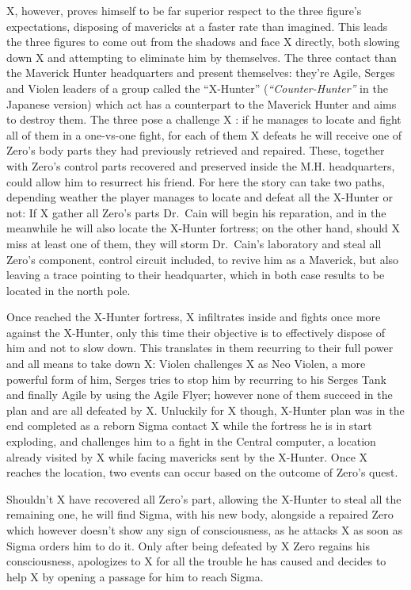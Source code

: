 X, however, proves himself to be far superior respect to the three figure's expectations, disposing of mavericks at a faster rate than imagined. This leads the three figures to come out from the shadows and face X directly, both slowing down X and attempting to eliminate him by themselves. The three contact than the Maverick Hunter headquarters and present themselves: they're Agile, Serges and Violen leaders of a group called the ``X-Hunter'' (\textit{``Counter-Hunter''} in the Japanese version) which act has a counterpart to the Maverick Hunter and aims to destroy them. The three pose a challenge X : if he manages to locate and fight all of them in a one-vs-one fight, for each of them X defeats he will receive one of Zero's body parts they had previously retrieved and repaired. These, together with Zero's control parts recovered and preserved inside the M.H. headquarters, could allow him to resurrect his friend. For here the story can take two paths, depending weather the player manages to locate and defeat all the X-Hunter or not:
If X gather all Zero's parts Dr.~Cain will begin his reparation, and in the meanwhile he will also locate the X-Hunter fortress; on the other hand, should X miss at least one of them, they will storm Dr.~Cain's laboratory and steal all Zero's component, control circuit included, to revive him as a Maverick, but also leaving a trace pointing to their headquarter, which in both case results to be located in the north pole.

Once reached the X-Hunter fortress, X infiltrates inside and fights once more against the X-Hunter, only this time their objective is to effectively dispose of him and not to slow down. This translates in them recurring to their full power and all means to take down X: Violen challenges X as Neo Violen, a more powerful form of him, Serges tries to stop him by recurring to his Serges Tank and finally Agile by using the Agile Flyer; however none of them succeed in the plan and are all defeated by X. Unluckily for X though, X-Hunter plan was in the end completed as a reborn Sigma contact X while the fortress he is in start exploding, and challenges him to a fight in the Central computer, a location already visited by X while facing mavericks sent by the X-Hunter. Once X reaches the location, two events can occur based on the outcome of Zero's quest.

Shouldn't X have recovered all Zero's part, allowing the X-Hunter to steal all the remaining one, he will find Sigma, with his new body, alongside a repaired Zero which however doesn't show any sign of consciousness, as he attacks X as soon as Sigma orders him to do it. Only after being defeated by X Zero regains his consciousness, apologizes to X for all the trouble he has caused and decides to help X by opening a passage for him to reach Sigma.

